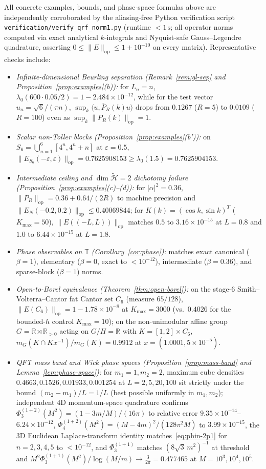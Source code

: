 \documentclass[11pt,a4paper]{article}
\theoremstyle{definition}
\theoremstyle{remark}
\newcommand{\tH}{\widetilde{\mathcal{H}}}
\newcommand{\RR}{\mathbb{R}}
\newcommand{\TT}{\mathbb{T}}
\newcommand{\op}{\mathrm{op}}
\newcommand{\ip}[2]{\langle #1, #2 \rangle}
\newcommand{\norm}[1]{\|#1\|}
\begin{document}
All concrete examples, bounds, and phase-space formulas above are independently corroborated by the aliasing-free Python verification script \texttt{verification/verify\_qrf\_norm1.py} (runtime $<1\,\mathrm{s}$; all operator norms computed via exact analytical $k$-integrals and Nyquist-safe Gauss--Legendre quadrature, asserting $0\le\norm{E}_{\op}\le 1+10^{-10}$ on every matrix). Representative checks include:
\begin{itemize}[leftmargin=*,nosep]
\item \emph{Infinite-dimensional Beurling separation (Remark~\ref{rem:gl-sep} and Proposition~\ref{prop:examples}(b)):} for $L_n=n$, $\lambda_0(600\cdot 0.05/2)=1-2.484\times 10^{-12}$, while for the test vector $u_n=\sqrt{6}/(\pi n)$, $\sup_k\ip{u}{\overline{P}_R(k)u}$ drops from $0.1267$ ($R=5$) to $0.0109$ ($R=100$) even as $\sup_k\norm{\overline{P}_R(k)}_{\op}=1$.
\item \emph{Scalar non-Toller blocks (Proposition~\ref{prop:examples}(b')):} on $S_6=\bigcup_{n=1}^6[4^n,4^n+n]$ at $\varepsilon=0.5$, $\norm{E_{S_6}(-\varepsilon,\varepsilon)}_{\op}=0.7625908153 \ge \lambda_0(1.5)=0.7625904153$.
\item \emph{Intermediate ceiling and $\dim\tH=2$ dichotomy failure (Proposition~\ref{prop:examples}(c)--(d)):} for $|\alpha|^2=0.36$, $\norm{\overline{P}_R}_{\op}=0.36+0.64/(2R)$ to machine precision and $\norm{E_N(-0.2,0.2)}_{\op}\le 0.40069844$; for $K(k)=(\cos k,\sin k)^T$ ($K_{\max}=50$), $\norm{E((-L,L))}_{\op}$ matches $0.5$ to $3.16\times 10^{-15}$ at $L=0.8$ and $1.0$ to $6.44\times 10^{-15}$ at $L=1.8$.
\item \emph{Phase observables on $\TT$ (Corollary~\ref{cor:phase}):} matches exact canonical ($\beta=1$), elementary ($\beta=0$, exact to $<10^{-12}$), intermediate ($\beta=0.36$), and sparse-block ($\beta=1$) norms.
\item \emph{Open-to-Borel equivalence (Theorem~\ref{thm:open-borel}):} on the stage-$6$ Smith--Volterra--Cantor fat Cantor set $C_6$ (measure $65/128$), $\norm{E(C_6)}_{\op}=1-1.78\times 10^{-8}$ at $K_{\max}=3000$ (vs.\ $0.4026$ for the bounded-$h$ control $K_{\max}=10$); on the non-unimodular affine group $G=\RR\rtimes\RR_{>0}$ acting on $G/H=\RR$ with $K=[1,2]\times C_6$, $m_G(K\cap Kx^{-1})/m_G(K)=0.9912$ at $x=(1.0001,5\times 10^{-5})$.
\item \emph{QFT mass band and Wick phase spaces (Proposition~\ref{prop:mass-band} and Lemma~\ref{lem:phase-space}):} for $m_1=1,m_2=2$, maximum cube densities $0.4663, 0.1526, 0.01933, 0.001254$ at $L=2,5,20,100$ sit strictly under the bound $(m_2-m_1)/L=1/L$ (best possible uniformly in $m_1,m_2$); independent $4$D momentum-space quadrature confirms $\Phi_3^{(1+2)}(M^2)=(1-3m/M)/(16\pi)$ to relative error $9.35\times 10^{-14}$--$6.24\times 10^{-12}$, $\Phi_4^{(1+2)}(M^2)=(M-4m)^2/(128\pi^2 M)$ to $3.99\times 10^{-15}$, the $3$D Euclidean Laplace-transform identity matches~\eqref{eq:phin-2p1} for $n=2,3,4,5$ to $<10^{-12}$, and $\Phi_3^{(1+1)}$ matches $(8\sqrt{3}\,m^2)^{-1}$ at threshold and $M^2\Phi_3^{(1+1)}(M^2)/\log(M/m)\to \frac{3}{2\pi}=0.477465$ at $M=10^3,10^4,10^5$.
\end{itemize}
\end{document}
